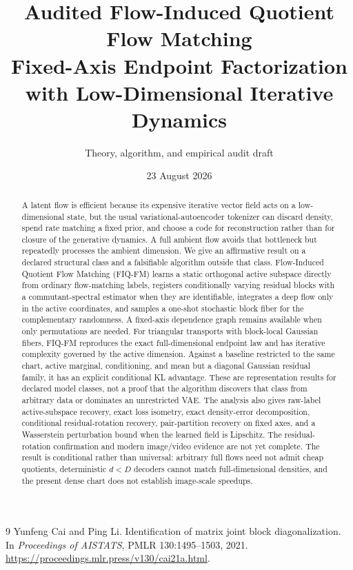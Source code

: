 \documentclass[11pt]{article}
\title{Audited Flow-Induced Quotient Flow Matching\\
\large Fixed-Axis Endpoint Factorization with Low-Dimensional Iterative Dynamics}
\author{Theory, algorithm, and empirical audit draft}
\date{23 August 2026}
\begin{document}
\maketitle

\begin{abstract}
A latent flow is efficient because its expensive iterative vector field acts on a low-dimensional state, but the usual variational-autoencoder tokenizer can discard density, spend rate matching a fixed prior, and choose a code for reconstruction rather than for closure of the generative dynamics.  A full ambient flow avoids that bottleneck but repeatedly processes the ambient dimension.  We give an affirmative result on a declared structural class and a falsifiable algorithm outside that class.  Flow-Induced Quotient Flow Matching (FIQ-FM) learns a static orthogonal active subspace directly from ordinary flow-matching labels, registers conditionally varying residual blocks with a commutant-spectral estimator when they are identifiable, integrates a deep flow only in the active coordinates, and samples a one-shot stochastic block fiber for the complementary randomness.  A fixed-axis dependence graph remains available when only permutations are needed.  For triangular transports with block-local Gaussian fibers, FIQ-FM reproduces the exact full-dimensional endpoint law and has iterative complexity governed by the active dimension.  Against a baseline restricted to the same chart, active marginal, conditioning, and mean but a diagonal Gaussian residual family, it has an explicit conditional KL advantage.  These are representation results for declared model classes, not a proof that the algorithm discovers that class from arbitrary data or dominates an unrestricted VAE.  The analysis also gives raw-label active-subspace recovery, exact loss isometry, exact density-error decomposition, conditional residual-rotation recovery, pair-partition recovery on fixed axes, and a Wasserstein perturbation bound when the learned field is Lipschitz.  The residual-rotation confirmation and modern image/video evidence are not yet complete.  The result is conditional rather than universal: arbitrary full flows need not admit cheap quotients, deterministic $d<D$ decoders cannot match full-dimensional densities, and the present dense chart does not establish image-scale speedups.
\end{abstract}




\begin{thebibliography}{9}
Yunfeng Cai and Ping Li.
\newblock Identification of matrix joint block diagonalization.
\newblock In \emph{Proceedings of AISTATS}, PMLR 130:1495--1503, 2021.
\newblock \url{https://proceedings.mlr.press/v130/cai21a.html}.
\end{thebibliography}
\end{document}
